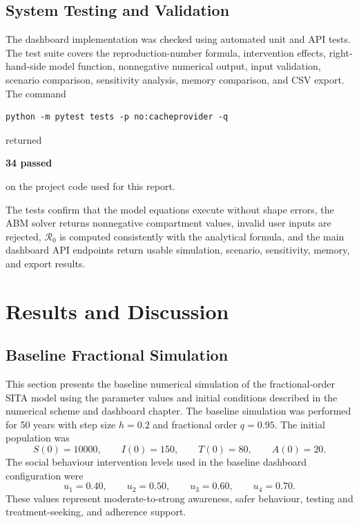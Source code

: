 \documentclass[12pt,a4paper,oneside]{report}
\newcommand{\Rzero}{\mathcal{R}_0}
\begin{document}
\section{System Testing and Validation}

The dashboard implementation was checked using automated unit and API tests. The test suite covers the reproduction-number formula, intervention effects, right-hand-side model function, nonnegative numerical output, input validation, scenario comparison, sensitivity analysis, memory comparison, and CSV export. The command
\begin{lstlisting}[style=pythonstyle]
python -m pytest tests -p no:cacheprovider -q
\end{lstlisting}
returned
\begin{center}
\textbf{34 passed}
\end{center}
on the project code used for this report.

\begin{remarkbox}[title={Dashboard validation summary}]
The tests confirm that the model equations execute without shape errors, the ABM solver returns nonnegative compartment values, invalid user inputs are rejected, $\Rzero$ is computed consistently with the analytical formula, and the main dashboard API endpoints return usable simulation, scenario, sensitivity, memory, and export results.
\end{remarkbox}

\chapter{Results and Discussion}

\section{Baseline Fractional Simulation}
This section presents the baseline numerical simulation of the fractional-order SITA model using the parameter values and initial conditions described in the numerical scheme and dashboard chapter. The baseline simulation was performed for 50 years with step size $h=0.2$ and fractional order $q=0.95$. The initial population was
\[
S(0)=10000,\qquad I(0)=150,\qquad T(0)=80,\qquad A(0)=20.
\]
The social behaviour intervention levels used in the baseline dashboard configuration were
\[
u_1=0.40,\qquad u_2=0.50,\qquad u_3=0.60,\qquad u_4=0.70.
\]
These values represent moderate-to-strong awareness, safer behaviour, testing and treatment-seeking, and adherence support.
\end{document}
